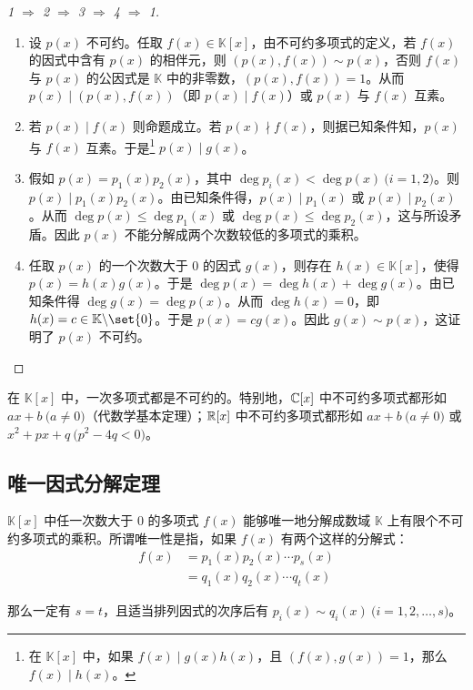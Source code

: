 \begin{proof}[1 $\Longrightarrow$ 2 $\Longrightarrow$ 3 $\Longrightarrow$ 4 $\Longrightarrow$ 1]
	\begin{enumerate}
		\item 设 $p(x)$ 不可约。任取 $f(x) \in \mathbb K[x]$，由不可约多项式的定义，若 $f(x)$ 的因式中含有 $p(x)$ 的相伴元，则 $(p(x), f(x)) \sim p(x)$，否则 $f(x)$ 与 $p(x)$ 的公因式是 $\mathbb K$ 中的非零数，$(p(x), f(x)) = 1$。从而 $p(x) \mid (p(x), f(x))$（即 $p(x) \mid f(x)$）或 $p(x)$ 与 $f(x)$ 互素。

		\item 若 $p(x) \mid f(x)$ 则命题成立。若 $p(x) \nmid f(x)$，则据已知条件知，$p(x)$ 与 $f(x)$ 互素。于是\footnote{在 $\mathbb K[x]$ 中，如果 $f(x) \mid g(x) h(x)$，且 $(f(x), g(x)) = 1$，那么 $f(x) \mid h(x)$。} $p(x) \mid g(x)$。

		\item 假如 $p(x) = p_1(x) p_2(x)$，其中 $\deg p_i(x) < \deg p(x) \pod{i = 1, 2}$。则 $p(x) \mid p_1(x) p_2(x)$。由已知条件得，$p(x) \mid p_1(x)$ 或 $p(x) \mid p_2(x)$。从而 $\deg p(x) \le \deg p_1(x)$ 或 $\deg p(x) \le \deg p_2(x)$，这与所设矛盾。因此 $p(x)$ 不能分解成两个次数较低的多项式的乘积。

		\item 任取 $p(x)$ 的一个次数大于 $0$ 的因式 $g(x)$，则存在 $h(x) \in \mathbb K[x]$，使得 $p(x) = h(x) g(x)$。于是 $\deg p(x) = \deg h(x) + \deg g(x)$。由已知条件得 $\deg g(x) = \deg p(x)$。从而 $\deg h(x) = 0$，即 $h(x) = c \in \mathbb K \backslash \set{0}$。于是 $p(x) = c g(x)$。因此 $g(x) \sim p(x)$，这证明了 $p(x)$ 不可约。
	\end{enumerate}
\end{proof}

在 $\mathbb K[x]$ 中，一次多项式都是不可约的。特别地，$\mathbb C[x]$ 中不可约多项式都形如 $ax + b \pod{a \ne 0}$（代数学基本定理）；$\mathbb R[x]$ 中不可约多项式都形如 $ax + b \pod{a \ne 0}$ 或 $x^2 + px + q \pod{p^2 - 4q < 0}$。

\subsection{唯一因式分解定理}

\begin{theorem}[唯一因式分解定理]
	$\mathbb K[x]$ 中任一次数大于 $0$ 的多项式 $f(x)$ 能够唯一地分解成数域 $\mathbb K$ 上有限个不可约多项式的乘积。所谓唯一性是指，如果 $f(x)$ 有两个这样的分解式：
	$$
	\begin{aligned}
		f(x) &= p_1(x) p_2(x) \cdots p_s(x)
		\\&=
		q_1(x) q_2(x) \cdots q_t(x)
	\end{aligned}
	$$

	那么一定有 $s = t$，且适当排列因式的次序后有 $p_i(x) \sim q_i(x) \pod{i = 1, 2, \ldots, s}$。
\end{theorem}

